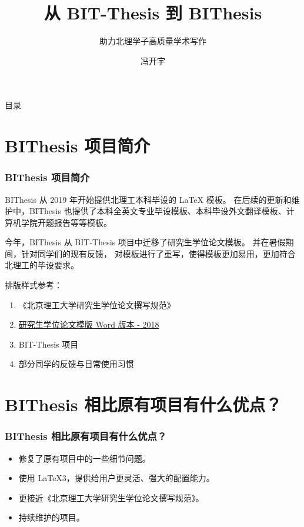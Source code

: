 \documentclass[
  aspectratio=169,
  presentation,
  titlegraphic=./images/bit.png,
  framelogo=./images/bit.png
]{bitbeamer}
\title{从 BIT-Thesis 到 BIThesis}
\subtitle{助力北理学子高质量学术写作}
\author{冯开宇}
\institute{北京理工大学}
\date{\zhtoday}
\begin{document}
\frame{\titlepage}

%
%
\begin{frame}{目录}
  \tableofcontents[hideallsubsections]
\end{frame}


\section{BIThesis 项目简介}

\begin{frame}[t]
  \frametitle{BIThesis 项目简介}
  BIThesis 从 2019 年开始提供北理工本科毕设的 LaTeX 模板。
  在后续的更新和维护中，BIThesis 也提供了本科全英文专业毕设模板、本科毕设外文翻译模板、计算机学院开题报告等等模板。

  今年，BIThesis 从 BIT-Thesis 项目中迁移了研究生学位论文模板。
  并在暑假期间，针对同学们的现有反馈，
  对模板进行了重写，使得模板更加易用，更加符合北理工的毕设要求。

  排版样式参考：
  \begin{enumerate}
    \item 《北京理工大学研究生学位论文撰写规范》
    \item \href{https://grd.bit.edu.cn/xwgz/xwgz2/wjxz_xwgz/b119746.htm}{研究生学位论文模版 Word 版本 - 2018}
    \item BIT-Thesis 项目
    \item 部分同学的反馈与日常使用习惯
  \end{enumerate}
\end{frame}




%
\section{BIThesis 相比原有项目有什么优点？}    %

\begin{frame}[t] %
  \frametitle{BIThesis 相比原有项目有什么优点？}

  \begin{itemize}
    \item 修复了原有项目中的一些细节问题。
    \item 使用 LaTeX3，提供给用户更灵活、强大的配置能力。
    \item 更接近《北京理工大学研究生学位论文撰写规范》。
    \item 持续维护的项目。
  \end{itemize}
\end{frame}
\end{document}
